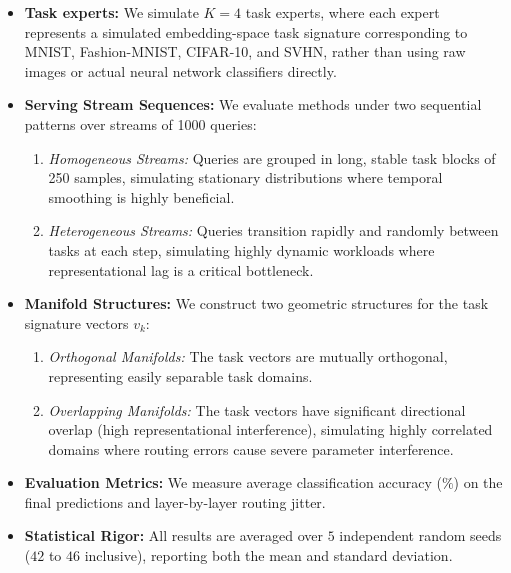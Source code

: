 \begin{itemize}
    \item \textbf{Task experts:} We simulate $K = 4$ task experts, where each expert represents a simulated embedding-space task signature corresponding to MNIST, Fashion-MNIST, CIFAR-10, and SVHN, rather than using raw images or actual neural network classifiers directly.
    \item \textbf{Serving Stream Sequences:} We evaluate methods under two sequential patterns over streams of 1000 queries:
    \begin{enumerate}
        \item \emph{Homogeneous Streams:} Queries are grouped in long, stable task blocks of 250 samples, simulating stationary distributions where temporal smoothing is highly beneficial.
        \item \emph{Heterogeneous Streams:} Queries transition rapidly and randomly between tasks at each step, simulating highly dynamic workloads where representational lag is a critical bottleneck.
    \end{enumerate}
    \item \textbf{Manifold Structures:} We construct two geometric structures for the task signature vectors $v_k$:
    \begin{enumerate}
        \item \emph{Orthogonal Manifolds:} The task vectors are mutually orthogonal, representing easily separable task domains.
        \item \emph{Overlapping Manifolds:} The task vectors have significant directional overlap (high representational interference), simulating highly correlated domains where routing errors cause severe parameter interference.
    \end{enumerate}
    \item \textbf{Evaluation Metrics:} We measure average classification accuracy ($\%$) on the final predictions and layer-by-layer routing jitter.
    \item \textbf{Statistical Rigor:} All results are averaged over $5$ independent random seeds ($42$ to $46$ inclusive), reporting both the mean and standard deviation.
\end{itemize}

